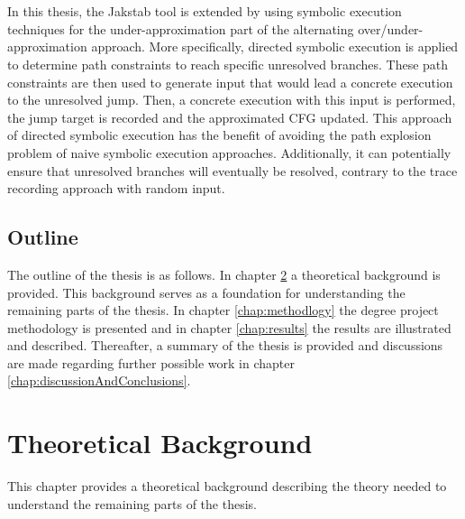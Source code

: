 \documentclass{kththesis}
\begin{document}
\\ \\
In this thesis, the Jakstab tool is extended by using symbolic execution techniques for the under-approximation part of the alternating over/under-approximation approach. More specifically, directed symbolic execution is applied to determine path constraints to reach specific unresolved branches. These path constraints are then used to generate input that would lead a concrete execution to the unresolved jump. Then, a concrete execution with this input is performed, the jump target is recorded and the approximated CFG updated. This approach of directed symbolic execution has the benefit of avoiding the path explosion problem of naive symbolic execution approaches. Additionally, it can potentially ensure that unresolved branches will eventually be resolved, contrary to the trace recording approach with random input.

\section{Outline}
The outline of the thesis is as follows. In chapter \ref{chap:background} a theoretical background is provided. This background serves as a foundation for understanding the remaining parts of the thesis. In chapter \ref{chap:methodlogy} the degree project methodology is presented and in chapter \ref{chap:results} the results are illustrated and described. Thereafter, a summary of the thesis is provided and discussions are made regarding further possible work in chapter \ref{chap:discussionAndConclusions}.
 
\chapter{Theoretical Background}\label{chap:background}
This chapter provides a theoretical background describing the theory needed to understand the remaining parts of the thesis.
\end{document}
